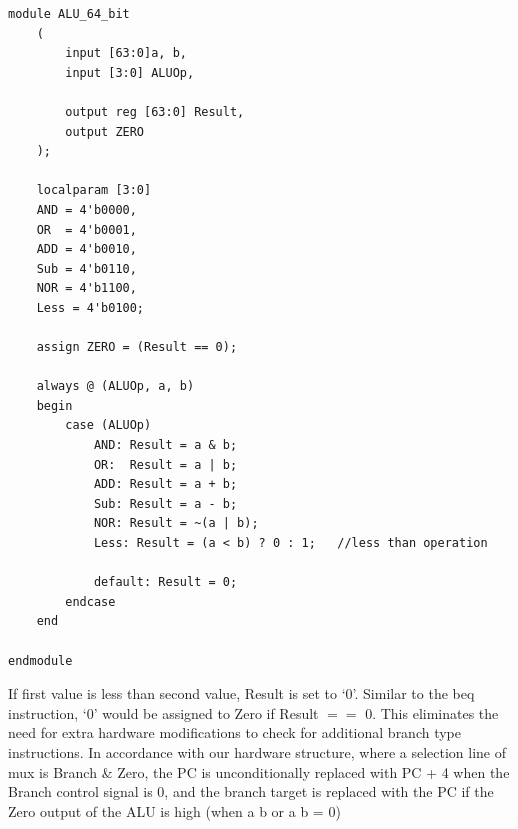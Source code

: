 \documentclass{article}
\begin{document}
\begin{lstlisting}[caption={Changes to ALU 64 bit}, captionpos=b, language=RISC-V]
module ALU_64_bit
    (
        input [63:0]a, b,
        input [3:0] ALUOp,
        
        output reg [63:0] Result,
        output ZERO
    );

    localparam [3:0]
    AND = 4'b0000,
    OR	= 4'b0001,
    ADD	= 4'b0010,
    Sub	= 4'b0110,
    NOR = 4'b1100,
    Less = 4'b0100;

    assign ZERO = (Result == 0);

    always @ (ALUOp, a, b)
    begin
        case (ALUOp)
            AND: Result = a & b;
            OR:	 Result = a | b;
            ADD: Result = a + b;
            Sub: Result = a - b;
            NOR: Result = ~(a | b);
            Less: Result = (a < b) ? 0 : 1;   //less than operation
            
            default: Result = 0;
        endcase
    end

endmodule
\end{lstlisting}

If first value is less than second value, Result is set to `0'. Similar to the beq instruction, `0' would be assigned to Zero if Result $ == $ 0. This eliminates the need for extra hardware modifications to check for additional branch type instructions. In accordance with our hardware structure, where a selection line of mux is Branch \& Zero, the PC is unconditionally replaced with PC + 4 when the Branch control signal is 0, and the branch target is replaced with the PC if the Zero output of the ALU is high (when a b or a b = 0)

% 
    
    
        
        
\end{document}

